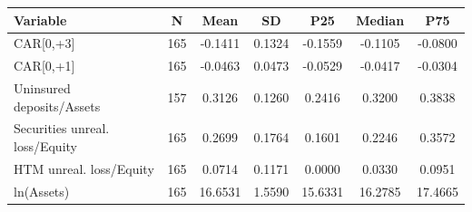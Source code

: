 \begin{tabular}{lcccccc}
\toprule
Variable & N & Mean & SD & P25 & Median & P75 \\
\midrule
CAR[0,+3] & 165 & -0.1411 & 0.1324 & -0.1559 & -0.1105 & -0.0800 \\
CAR[0,+1] & 165 & -0.0463 & 0.0473 & -0.0529 & -0.0417 & -0.0304 \\
Uninsured deposits/Assets & 157 & 0.3126 & 0.1260 & 0.2416 & 0.3200 & 0.3838 \\
Securities unreal. loss/Equity & 165 & 0.2699 & 0.1764 & 0.1601 & 0.2246 & 0.3572 \\
HTM unreal. loss/Equity & 165 & 0.0714 & 0.1171 & 0.0000 & 0.0330 & 0.0951 \\
ln(Assets) & 165 & 16.6531 & 1.5590 & 15.6331 & 16.2785 & 17.4665 \\
\bottomrule
\end{tabular}